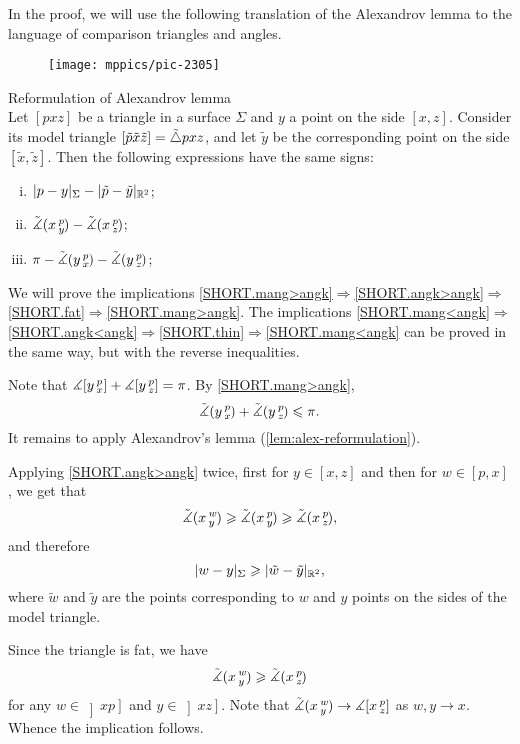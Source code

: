 In the proof, we will use the following translation of the Alexandrov lemma to the language of comparison triangles and angles.

\begin{wrapfigure}{r}{25mm}
\vskip-0mm
\centering
\texttt{[image: mppics/pic-2305]}
\end{wrapfigure}

\begin{thm}{Reformulation of Alexandrov lemma}\label{lem:alex-reformulation}\\
Let $[pxz]$ be a triangle in a surface $\Sigma$
and $y$ a point on the side $[x,z]$.
Consider its model triangle $[\tilde p\tilde x\tilde z]\z=\tilde\triangle pxz$, and let $\tilde y$ be the corresponding point on the side $[\tilde x,\tilde z]$.
Then the following expressions have the same signs:
\begin{enumerate}[(i)]
 \item $\dist{p}{y}\Sigma-\dist{\tilde p}{\tilde y}{\mathbb{R}^2}$;
 \item $\tilde\measuredangle(x\,{}^{p}_{y}\hspace{-0.2ex})-\tilde\measuredangle(x\,{}^{p}_{z}\hspace{-0.2ex})$;
 \item $\pi-\tilde\measuredangle(y\,{}^{p}_{x}\hspace{-0.2ex})-\tilde\measuredangle(y\,{}^{p}_{z}\hspace{-0.2ex})$;
\end{enumerate}
\end{thm}

We will prove the implications \ref{SHORT.mang>angk}$\Rightarrow$\ref{SHORT.angk>angk}$\Rightarrow$\ref{SHORT.fat}$\Rightarrow$\ref{SHORT.mang>angk}.
The implications \ref{SHORT.mang<angk}$\Rightarrow$\ref{SHORT.angk<angk}$\Rightarrow$\ref{SHORT.thin}$\Rightarrow$\ref{SHORT.mang<angk} can be proved in the same way, but with the reverse inequalities.

Note that $\measuredangle[y\,{}^{p}_{x}]+\measuredangle[y\,{}^{p}_{z}]=\pi$.
By \ref{SHORT.mang>angk}, 
\[\tilde\measuredangle(y\,{}^{p}_{x}\hspace{-0.2ex})+\tilde\measuredangle(y\,{}^{p}_{z}\hspace{-0.2ex})\leqslant \pi.\]
It remains to apply Alexandrov's lemma (\ref{lem:alex-reformulation}).

Applying \ref{SHORT.angk>angk} twice, first for $y\in [x,z]$ and then for $w\in [p,x]$, we get that
\[\tilde\measuredangle(x\,{}^{w}_{y}\hspace{-0.2ex}) \geqslant \tilde\measuredangle(x\,{}^{p}_{y}\hspace{-0.2ex}) \geqslant \tilde\measuredangle(x\,{}^{p}_{z}\hspace{-0.2ex}),\]
and therefore
\[\dist{w}{y}\Sigma\ge \dist{\tilde w}{\tilde y}{\mathbb{R}^2},\]
where $\tilde w$ and $\tilde y$ are the points corresponding to $w$ and $y$ points on the sides of the model triangle. 

Since the triangle is fat, we have 
\[\tilde\measuredangle(x\,{}^{w}_{y}\hspace{-0.2ex}) \geqslant \tilde\measuredangle(x\,{}^{p}_{z}\hspace{-0.2ex})\]
for any $w\in \left]xp\right]$ and $y\in \left]xz\right]$.
Note that $\tilde\measuredangle(x\,{}^{w}_{y}\hspace{-0.2ex})\to \measuredangle[x\,{}^{p}_{z}]$ as $w,y\to x$.
Whence the implication follows.
\qeds


